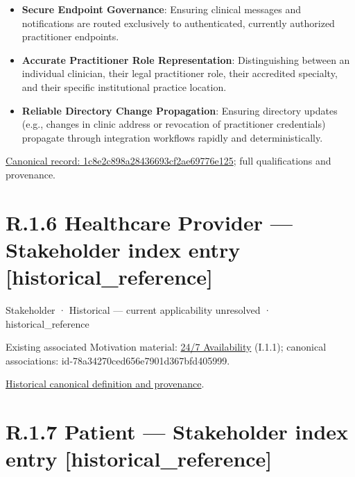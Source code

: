 \begin{itemize}


\item \textbf{Secure Endpoint Governance}: Ensuring clinical messages and notifications are routed exclusively to authenticated, currently authorized practitioner endpoints.

\item \textbf{Accurate Practitioner Role Representation}: Distinguishing between an individual clinician, their legal practitioner role, their accredited specialty, and their specific institutional practice location.

\item \textbf{Reliable Directory Change Propagation}: Ensuring directory updates (e.g., changes in clinic address or revocation of practitioner credentials) propagate through integration workflows rapidly and deterministically.

\end{itemize}

{\footnotesize \href{../../../../continuum/motivation/stakeholder/1c8e2c898a28436693cf2ae69776e125.md}{Canonical record: 1c8e2c898a28436693cf2ae69776e125}; full qualifications and provenance.}\par
\section*{R.1.6 Healthcare Provider — Stakeholder index entry [historical\_reference]}
\label{navigation:R.1.6}

\label{element:2018200a493d458096b72031cc2ae779}
{\small Stakeholder · Historical — current applicability unresolved · historical\_reference}\par
{\small Existing associated Motivation material: \hyperref[element:782f53e2190f4a8a8d0dc0a33cd6fbb3]{24/7 Availability} (I.1.1); canonical associations: id-78a34270ced656e7901d367bfd405999.}\par
\href{../../../../continuum/motivation/stakeholder/2018200a493d458096b72031cc2ae779.md}{Historical canonical definition and provenance}.\par
\section*{R.1.7 Patient — Stakeholder index entry [historical\_reference]}
\label{navigation:R.1.7}

